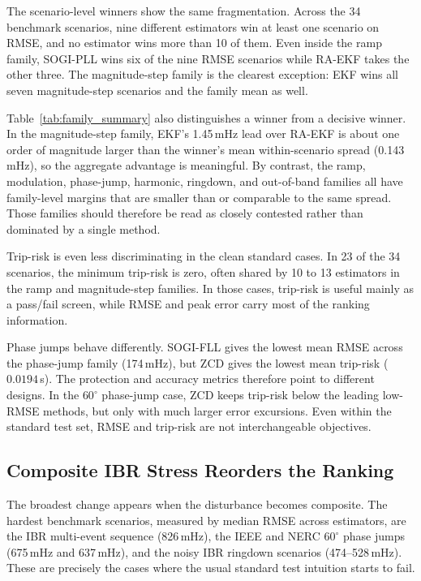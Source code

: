 The scenario-level winners show the same fragmentation. Across the 34
benchmark scenarios, nine different estimators win at least one scenario on
RMSE, and no estimator wins more than 10 of them. Even inside the ramp
family, SOGI-PLL wins six of the nine RMSE scenarios while RA-EKF takes the
other three. The magnitude-step family is the clearest exception: EKF wins all
seven magnitude-step scenarios and the family mean as well.

Table~\ref{tab:family_summary} also distinguishes a winner from a decisive
winner. In the magnitude-step family, EKF's 1.45\,mHz lead over RA-EKF is about
one order of magnitude larger than the winner's mean within-scenario spread
(0.143\,mHz), so the aggregate advantage is meaningful. By contrast, the ramp,
modulation, phase-jump, harmonic, ringdown, and out-of-band families all have
family-level margins that are smaller than or comparable to the same spread.
Those families should therefore be read as closely contested rather than
dominated by a single method.

Trip-risk is even less discriminating in the clean standard cases. In 23 of the
34 scenarios, the minimum trip-risk is zero, often
shared by 10 to 13 estimators in the ramp and magnitude-step families. In those
cases, trip-risk is useful mainly as a pass/fail screen, while RMSE and peak
error carry most of the ranking information.

Phase jumps behave differently. SOGI-FLL gives the lowest mean RMSE across the
phase-jump family (174\,mHz), but ZCD gives the lowest mean trip-risk
($0.0194$\,s). The protection and accuracy metrics therefore point to
different designs. In the $60^\circ$ phase-jump case, ZCD keeps trip-risk below
the leading low-RMSE methods, but only with much larger error excursions. Even
within the standard test set, RMSE and trip-risk are not interchangeable
objectives.

\subsection{Composite IBR Stress Reorders the Ranking}

The broadest change appears when the disturbance becomes composite. The hardest
benchmark scenarios, measured by median RMSE across estimators, are the IBR
multi-event sequence (826\,mHz), the IEEE and NERC $60^\circ$ phase jumps
(675\,mHz and 637\,mHz), and the noisy IBR ringdown scenarios
(474--528\,mHz). These are precisely the cases where the usual standard test
intuition starts to fail.

